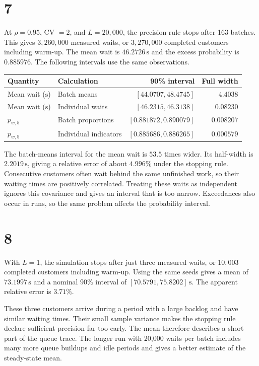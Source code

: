 \documentclass[11pt,a4paper]{article}
\newcommand{\unitsec}{\,\mathrm{s}}
\begin{document}
\section*{7}

At \(\rho=0.95\), CV \(=2\), and \(L=20{,}000\), the precision rule
stops after 163 batches. This gives \(3{,}260{,}000\) measured waits,
or \(3{,}270{,}000\) completed customers including warm-up. The mean wait
is \(46.2726\unitsec\) and the excess probability is \(0.885976\).
The following intervals use the same observations.

\begin{center}
\small
\begin{tabular}{@{}llrr@{}}
\toprule
Quantity & Calculation & 90\% interval & Full width\\
\midrule
Mean wait (\(\mathrm{s}\)) & Batch means & \([44.0707,48.4745]\) & \(4.4038\)\\
Mean wait (\(\mathrm{s}\)) & Individual waits & \([46.2315,46.3138]\) & \(0.08230\)\\
\(p_{w,5}\) & Batch proportions & \([0.881872,0.890079]\) & \(0.008207\)\\
\(p_{w,5}\) & Individual indicators & \([0.885686,0.886265]\) & \(0.000579\)\\
\bottomrule
\end{tabular}
\end{center}

The batch-means interval for the mean wait is \(53.5\) times wider.
Its half-width is \(2.2019\unitsec\), giving a relative error of about
\(4.996\%\) under the stopping rule. Consecutive customers often wait
behind the same unfinished work, so their waiting times are positively
correlated. Treating these waits as independent ignores this covariance
and gives an interval that is too narrow. Exceedances also occur in
runs, so the same problem affects the probability interval.

\clearpage
\section*{8}

With \(L=1\), the simulation stops after just three measured waits,
or \(10{,}003\) completed customers including warm-up. Using the same
seeds gives a mean of \(73.1997\unitsec\) and a nominal 90\% interval
of \([70.5791,75.8202]\unitsec\). The apparent relative error is
\(3.71\%\).

These three customers arrive during a period with a large backlog and
have similar waiting times. Their small sample variance makes the
stopping rule declare sufficient precision far too early. The mean
therefore describes a short part of the queue trace. The longer run
with 20,000 waits per batch includes many more queue buildups and idle
periods and gives a better estimate of the steady-state mean.
\end{document}

